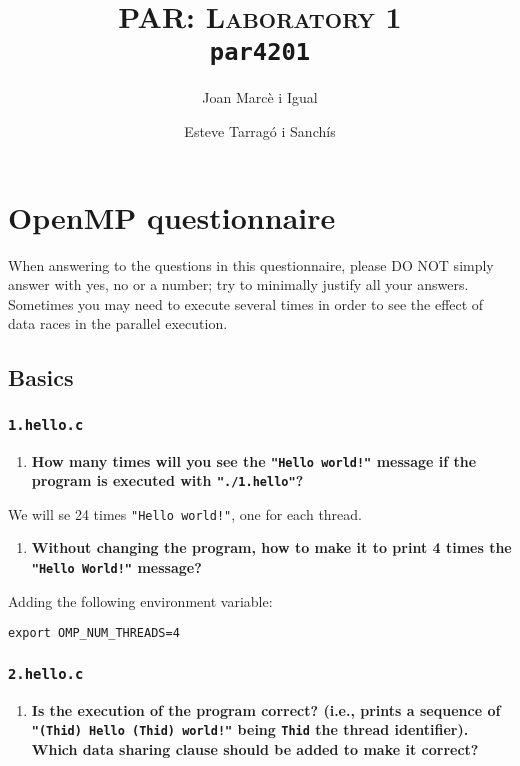 \documentclass[a4paper]{article}
\title{
	\textsc{PAR: Laboratory 1} \\
	\texttt{\large par4201}
}
\author{Joan Marcè i Igual \and Esteve Tarragó i Sanchís}
\begin{document}
\maketitle
\tableofcontents
\pagebreak

\section{OpenMP questionnaire}

When answering to the questions in this questionnaire, please DO NOT simply answer with yes, no or a number; try to minimally justify all your answers. Sometimes you may need to execute several times in order to see the effect of data races in the parallel execution.

\subsection{Basics}

\subsubsection{\texttt{1.hello.c}}

\begin{enumerate}
	\item \textbf{How many times will you see the \texttt{"Hello world!"} message if the program is executed with \texttt{"./1.hello"}?}
\end{enumerate}

We will se 24 times \texttt{"Hello world!"}, one for each thread.

\begin{enumerate}[resume]
	\item \textbf{Without changing the program, how to make it to print 4 times the \texttt{"Hello World!"} message?}
\end{enumerate}

Adding the following environment variable:

\verb|export OMP_NUM_THREADS=4|

\subsubsection{\texttt{2.hello.c}}

\begin{enumerate}
	\item \textbf{Is the execution of the program correct? (i.e., prints a sequence of \texttt{"(Thid) Hello (Thid) world!"} being \texttt{Thid} the thread identifier). Which data sharing clause should be added to make it correct?}
\end{enumerate}
\end{document}

